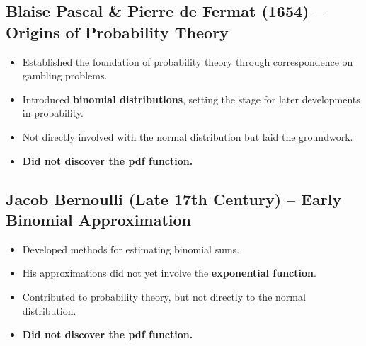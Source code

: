 \documentclass{article}
\begin{document}
\subsection{Blaise Pascal \& Pierre de Fermat (1654) – Origins of Probability Theory}
\begin{itemize}
    \item Established the foundation of probability theory through correspondence on gambling problems.
    \item Introduced \textbf{binomial distributions}, setting the stage for later developments in probability.
    \item Not directly involved with the normal distribution but laid the groundwork.
    \item \textbf{Did not discover the pdf function.}
\end{itemize}

\subsection{Jacob Bernoulli (Late 17th Century) – Early Binomial Approximation}
\begin{itemize}
    \item Developed methods for estimating binomial sums.
    \item His approximations did not yet involve the \textbf{exponential function}.
    \item Contributed to probability theory, but not directly to the normal distribution.
    \item \textbf{Did not discover the pdf function.}
\end{itemize}
\end{document}
